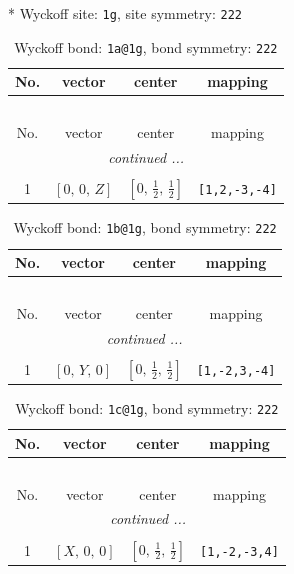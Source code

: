\documentclass[fleqn,8pt]{jsarticle}
\begin{document}
* Wyckoff site: {\tt 1g}, site symmetry: {\tt 222}
\renewcommand{\arraystretch}{1.2}
\begin{longtable}{cccc}
\caption{Wyckoff bond: {\tt 1a@1g}, bond symmetry: {\tt 222}}
 \\
 \hline \hline
No. & vector & center & mapping \\ \hline \endfirsthead

\multicolumn{3}{l}{\tablename\ \thetable{}} \\
 \hline \hline
No. & vector & center & mapping \\ \hline \endhead

 \hline \hline
\multicolumn{3}{r}{\footnotesize\it continued ...} \\ \endfoot

 \hline \hline
\multicolumn{3}{r}{} \\ \endlastfoot

1 & $\left[ 0,\, 0,\, Z \right]$ & $\left[ 0,\, \frac{1}{2},\, \frac{1}{2} \right]$ & {\tt [1,2,-3,-4]} \\
\end{longtable}
\renewcommand{\arraystretch}{1.2}
\begin{longtable}{cccc}
\caption{Wyckoff bond: {\tt 1b@1g}, bond symmetry: {\tt 222}}
 \\
 \hline \hline
No. & vector & center & mapping \\ \hline \endfirsthead

\multicolumn{3}{l}{\tablename\ \thetable{}} \\
 \hline \hline
No. & vector & center & mapping \\ \hline \endhead

 \hline \hline
\multicolumn{3}{r}{\footnotesize\it continued ...} \\ \endfoot

 \hline \hline
\multicolumn{3}{r}{} \\ \endlastfoot

1 & $\left[ 0,\, Y,\, 0 \right]$ & $\left[ 0,\, \frac{1}{2},\, \frac{1}{2} \right]$ & {\tt [1,-2,3,-4]} \\
\end{longtable}
\renewcommand{\arraystretch}{1.2}
\begin{longtable}{cccc}
\caption{Wyckoff bond: {\tt 1c@1g}, bond symmetry: {\tt 222}}
 \\
 \hline \hline
No. & vector & center & mapping \\ \hline \endfirsthead

\multicolumn{3}{l}{\tablename\ \thetable{}} \\
 \hline \hline
No. & vector & center & mapping \\ \hline \endhead

 \hline \hline
\multicolumn{3}{r}{\footnotesize\it continued ...} \\ \endfoot

 \hline \hline
\multicolumn{3}{r}{} \\ \endlastfoot

1 & $\left[ X,\, 0,\, 0 \right]$ & $\left[ 0,\, \frac{1}{2},\, \frac{1}{2} \right]$ & {\tt [1,-2,-3,4]} \\
\end{longtable}
\end{document}
